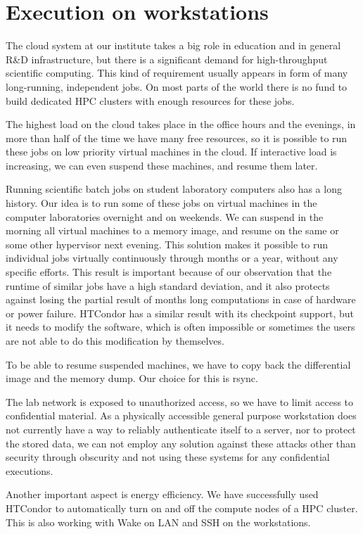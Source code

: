 \documentclass{llncs}
\begin{document}
\section{Execution on workstations}
The cloud system at our institute takes a big role in education and in general R{\&}D infrastructure, but there is a significant demand for high-throughput scientific computing. This  kind of requirement usually appears in form of many long-running, independent jobs. On most parts of the world there is no fund to build dedicated HPC clusters with enough resources for these jobs.

The highest load on the cloud takes place in the office hours and the evenings, in more than half of the time we have many free resources, so it is possible to run these jobs on low priority virtual machines in the cloud. If interactive load is increasing, we can even suspend these machines, and resume them later.

Running scientific batch jobs on student laboratory computers also has a long history. Our idea is to run some of these jobs on virtual machines in the computer laboratories overnight and on weekends. We can suspend in the morning all virtual machines to a memory image, and resume on the same or some other hypervisor next evening. This solution makes it possible to run individual jobs virtually continuously through months or a year, without any specific efforts. This result is important because of our observation that the runtime of similar jobs have a high standard deviation, and it also protects against losing the partial result of months long computations in case of hardware or power failure. HTCondor has a similar result with its checkpoint support, but it needs to modify the software, which is often impossible or sometimes the users are not able to do this modification by themselves. 

To be able to resume suspended machines, we have to copy back the differential image and the memory dump. Our choice for this is rsync.

The lab network is exposed to unauthorized access, so we have to limit access to confidential material. As a physically accessible general purpose workstation does not currently have a way to reliably authenticate itself to a server, nor to protect the stored data, we can not employ any solution against these attacks other than security through obscurity and not using these systems for any confidential executions.

Another important aspect is energy efficiency. We have successfully used HTCondor to automatically turn on and off the compute nodes of a HPC cluster. This is also working with Wake on LAN and SSH on the workstations.
\end{document}

